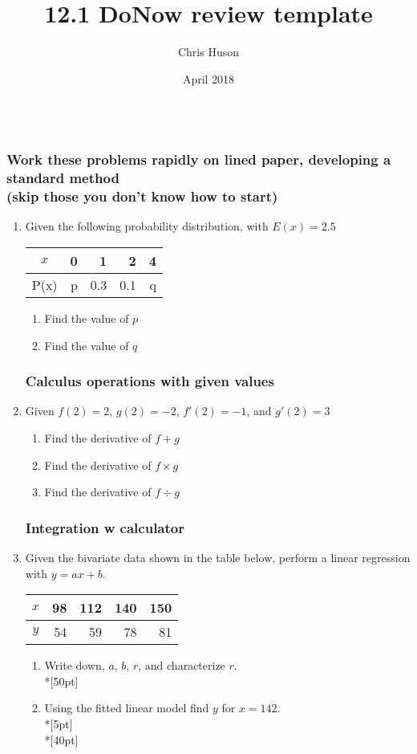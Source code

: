 \documentclass[12pt, oneside]{article}
\title{12.1 DoNow review template}
\author{Chris Huson}
\date{April 2018}
\begin{document}
\subsubsection*{\\ \textnormal{Work these problems rapidly on lined paper, developing a standard method \\(skip those you don't know how to start)}}

\begin{enumerate}
\subsubsection*{Expected value given table (fair)}
\item Given the following probability distribution, with $E(x)=2.5$\\
\begin{tabular}{|c|r|r|r|r|}
\hline 
$x$ & 0 & 1 & 2 & 4 \\ 
\hline 
P(x) & p & 0.3 & 0.1 & q  \\ 
\hline 
\end{tabular}
\begin{enumerate}
    \item Find the value of $p$
    \item Find the value of $q$
\end{enumerate}

\subsubsection*{Calculus operations with given values}
\item Given $f(2)=2$, $g(2)=-2$, $f'(2)=-1$, and $g'(2)=3$
\begin{enumerate}
    \item Find the derivative of $f+g$
    \item Find the derivative of $f \times g$
    \item Find the derivative of $f \div g$
\end{enumerate}

\newpage
\subsubsection*{Integration w calculator}
\item Given the bivariate data shown in the table below, perform a linear regression with $y=ax+b$.\\
\begin{tabular}{|c|r|r|r|r|}
\hline 
$x$ & 98 & 112 & 140 & 150\\ 
\hline 
$y$ & 54 & 59 & 78 & 81  \\ 
\hline 
\end{tabular}
\begin{enumerate}
    \item Write down, $a$, $b$, $r$, and characterize $r$.\\*[50pt]
\item Using the fitted linear model find $y$ for $x=142$.\\*[5pt]
\\*[40pt]


\end{enumerate}
\end{enumerate}
\end{document}
